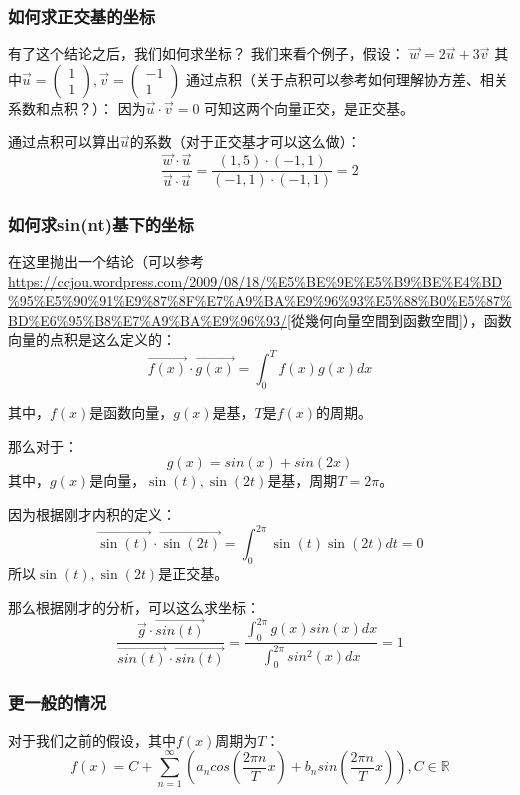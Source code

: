 \documentclass[12pt]{article}
\begin{document}
\subsubsection{如何求正交基的坐标}
有了这个结论之后，我们如何求坐标？
我们来看个例子，假设：
$\vec{w_{}}=2\vec{u_{}}+3\vec{v_{}}$
其中$\vec{u_{}}=\begin{pmatrix}1\\1\end{pmatrix},\vec{v_{}}=\begin{pmatrix}-1\\1\end{pmatrix}$
通过点积（关于点积可以参考如何理解协方差、相关系数和点积？）：
因为$\vec{u_{}}\cdot \vec{v_{}}=0$
可知这两个向量正交，是正交基。

通过点积可以算出$\vec{u_{}}$的系数（对于正交基才可以这么做）：
$$
\frac{\vec{w_{}}\cdot \vec{u_{}}}{\vec{u_{}}\cdot \vec{u_{}}}=\frac{(1,5)\cdot(-1,1)}{(-1,1)\cdot(-1,1)}=2
$$

\subsubsection{如何求sin(nt)基下的坐标}
在这里抛出一个结论（可以参考\url{https://ccjou.wordpress.com/2009/08/18/%E5%BE%9E%E5%B9%BE%E4%BD%95%E5%90%91%E9%87%8F%E7%A9%BA%E9%96%93%E5%88%B0%E5%87%BD%E6%95%B8%E7%A9%BA%E9%96%93/}[從幾何向量空間到函數空間]），函数向量的点积是这么定义的：
$$
\overrightarrow{f(x)}\cdot\overrightarrow{g(x)}=\int_{0}^{T}f(x)g(x)dx
$$

其中，$f(x)$是函数向量，$g(x)$是基，$T$是$f(x)$的周期。

那么对于：
$$
g(x)=sin(x)+sin(2x)
$$
其中，$g(x)$是向量，$\sin(t),\sin(2t)$是基，周期$T=2\pi$。

因为根据刚才内积的定义：
$$
\overrightarrow{\sin(t)}\cdot\overrightarrow{\sin(2t)}=\int_{0}^{2\pi}\sin(t)\sin(2t)dt=0
$$
所以$\sin(t),\sin(2t)$是正交基。

那么根据刚才的分析，可以这么求坐标：
$$
\frac{\overrightarrow{g_{}}\cdot \overrightarrow{sin(t)}}{\overrightarrow{sin(t)}\cdot \overrightarrow{sin(t)}}=\frac{\int_{0}^{2\pi}g(x)sin(x)dx}{\int_{0}^{2\pi}sin^2(x)dx}=1
$$

\subsubsection{更一般的情况}
对于我们之前的假设，其中$f(x)$周期为$T$：
$$
f(x)=C+\sum _{{n=1}}^{\infty}\left(a_{n}cos({\frac{2\pi n}{T}x})+b_{n}sin({\frac{2\pi n}{T}x})\right),C\in\mathbb{R}
$$
\end{document}
